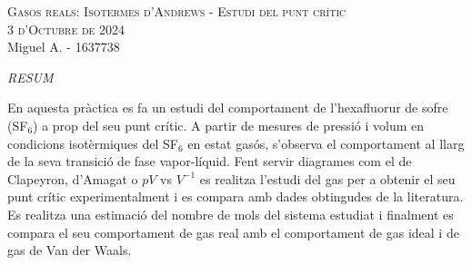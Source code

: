 \documentclass[12pt,twosides,onecolumn,openany]{article}
\begin{document}
\begin{center}
    {\Large \textsc{Gasos reals: Isotermes d'Andrews - Estudi del punt crític}}\\
    \vspace{0.2cm}
    \textsc{3 d'Octubre de 2024}\\
    \vspace{0.2cm}
    Miguel A. - 1637738
\end{center}
\begin{center}
    \textsc{\textit{RESUM}}
\end{center}
En aquesta pràctica es fa un estudi del comportament de l'hexafluorur de sofre (SF$_6$) a prop del seu punt crític. A partir de mesures de pressió i volum en condicions isotèrmiques del SF$_6$ en estat gasós, s'observa el comportament al llarg de la seva transició de fase vapor-líquid. Fent servir diagrames com el de Clapeyron, d'Amagat o $pV$ vs $V^{-1}$ es realitza l'estudi del gas per a obtenir el seu punt crític experimentalment i es compara amb dades obtingudes de la literatura. Es realitza una estimació del nombre de mols del sistema estudiat i finalment es compara el seu comportament de gas real amb el comportament de gas ideal i de gas de Van der Waals.
\vspace{0.5cm}
\end{document}
